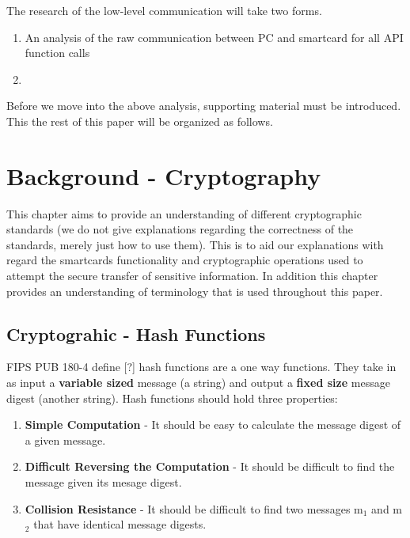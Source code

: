 \documentclass[bsc,frontabs,twoside,singlespacing,parskip,deptreport]{infthesis}     %
\begin{document}
The research of the low-level communication will take two forms. 
\begin{enumerate}
\item An analysis of the raw communication between PC and smartcard for all API function calls
\item 
\end{enumerate}


Before we move into the above analysis, supporting material must be introduced. This the rest of this paper will be organized as follows.



\chapter{Background - Cryptography}

This chapter aims to provide an understanding of different cryptographic standards (we do not give explanations regarding the correctness of the standards, merely just how to use them). This is to aid our explanations with regard the smartcards functionality and cryptographic operations used to attempt the secure transfer of sensitive information. In addition this chapter provides an understanding of terminology that is used throughout this paper.

\section{Cryptograhic - Hash Functions}

FIPS PUB 180-4 define [?] hash functions are a one way functions. They take in as input a \textbf{variable sized} message (a string) and output a \textbf{fixed size} message digest (another string). Hash functions should hold three properties:
\begin{enumerate}
\item \textbf{Simple Computation} - It should be easy to calculate the message digest of a given message.
\item \textbf{Difficult Reversing the Computation} - It should be difficult to find the message given its mesage digest.
\item \textbf{Collision Resistance} - It should be difficult to find two messages m$_1$ and m$_2$ that have identical message digests.
\end{enumerate}
\end{document}
